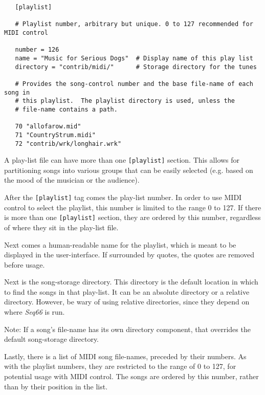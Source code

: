    \begin{verbatim}
   [playlist]

   # Playlist number, arbitrary but unique. 0 to 127 recommended for MIDI control

   number = 126
   name = "Music for Serious Dogs"  # Display name of this play list
   directory = "contrib/midi/"      # Storage directory for the tunes

   # Provides the song-control number and the base file-name of each song in
   # this playlist.  The playlist directory is used, unless the
   # file-name contains a path.

   70 "allofarow.mid"
   71 "CountryStrum.midi"
   72 "contrib/wrk/longhair.wrk"
   \end{verbatim}

   A play-list file can have more than one \texttt{[playlist]} section.  This
   allows for partitioning songs into various groups that can be easily
   selected (e.g. based on the mood of the musician or the audience).

   After the \texttt{[playlist]} tag comes the play-list number.
   In order to use MIDI control to select the playlist, this number
   is limited to the range 0 to 127.
   If there is more than one \texttt{[playlist]} section, they are ordered by
   this number, regardless of where they sit in the play-list file.

   Next comes a human-readable name for the playlist, which is meant to be
   displayed in the user-interface.  If surrounded by quotes, the quotes are
   removed before usage.

   Next is the song-storage directory.
   This directory is the default location in which to find the songs
   in that play-list.
   It can be an absolute directory or a relative directory.
   However, be wary of using relative directories, since they depend on where
   \textsl{Seq66} is run.

   Note: If a song's file-name has its own directory component, that overrides
   the default song-storage directory.

   Lastly, there is a list of MIDI song file-names, preceded by their numbers.
   As with the playlist numbers, they are restricted to the range of 0 to
   127, for potential usage with MIDI control.
   The songs are ordered by this number,
   rather than by their position in the list.

